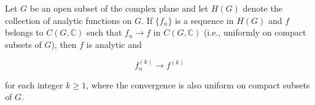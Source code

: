 Let $G$ be an open subset of the complex plane and let $H(G)$ denote the collection of analytic functions on $G$. If $\{f_n\}$ is a sequence in $H(G)$ and $f$ belongs to $C(G, \mathbb{C})$ such that $f_n \to f$ in $C(G, \mathbb{C})$ (i.e., uniformly on compact subsets of $G$), then $f$ is analytic and

$$f_n^{(k)} \to f^{(k)}$$

for each integer $k \geq 1$, where the convergence is also uniform on compact subsets of $G$.
